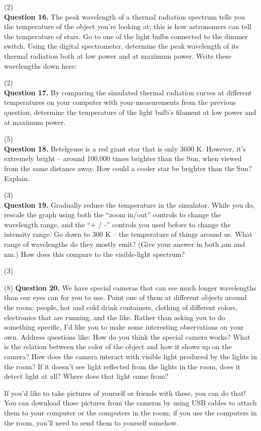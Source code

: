 \documentclass[11pt]{article}
\begin{document}
\vspace{2cm}
(2) \hrulefill\\

\textbf {Question 16.} The peak wavelength of a thermal radiation spectrum tells you the temperature of the object you're looking at; this is how astronomers can tell the temperature of stars. Go to one of the light bulbs connected to the dimmer switch. Using the digital spectrometer, determine the peak wavelength of its thermal radiation both at low power and at maximum power. Write these wavelengths down here:

\vspace{2cm}
(2) \hrulefill\\

\textbf {Question 17.} By comparing the simulated thermal radiation curves at different temperatures on your computer with your measurements from the previous question, determine the temperature of the light bulb's filament at low power and at maximum power. 

\vspace{3cm}
(5) \hrulefill\\

\newpage
\textbf {Question 18.} Betelgeuse is a red giant star that is only 3600 K. However, it's extremely bright -- around 100,000 times brighter than the Sun, when viewed from the same distance away. How could a cooler star be brighter than the Sun? Explain.

\vspace{2cm}
(3) \hrulefill\\

\textbf {Question 19.} Gradually reduce the temperature in the simulator. While you do, rescale the graph using both the ``zoom in/out'' controls to change the wavelength range, and the ``+ / -'' controls you used before to change the intensity range. Go down to 300 K --
the temperature of things around us. What range of wavelengths do they mostly emit? (Give your answer in both $\mu$m and nm.) How does this compare to the visible-light spectrum? 

\vspace{3cm}
(3) \hrulefill\\

\newpage

(8) \textbf {Question 20.} We have special cameras that can see much longer wavelengths than our eyes can for you to use. Point one of them at different objects around the room: people, hot and cold drink containers, clothing of different colors, electronics that are running, and the like. Rather than asking you to do something specific, I'd like you to make some interesting observations on your own. Address questions like: How do you think the special camera works? What is the relation between the color of the object and how it shows up on the camera? How does the camera interact with visible light produced by the lights in the room? If it doesn't see light reflected from the lights in the room, does it detect light at all? Where does that light come from?

If you'd like to take pictures of yourself or friends with these, you can do that! You can download those pictures from the cameras by using USB cables to attach them to your computer or the computers in the room; if you use the computers in the room, you'll need to send them to yourself somehow.
\end{document}
